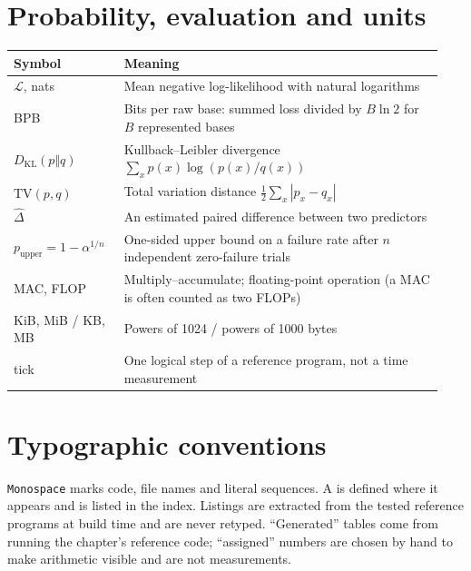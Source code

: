 \section{Probability, evaluation and units}
\begin{center}\small
\begin{tabular}{@{}P{0.24\linewidth}P{0.70\linewidth}@{}}
\toprule
Symbol & Meaning\\\midrule
$\mathcal L$, nats & Mean negative log-likelihood with natural logarithms\\
BPB & Bits per raw base: summed loss divided by $B\ln2$ for $B$ represented bases\\
$D_{\mathrm{KL}}(p\Vert q)$ & Kullback--Leibler divergence $\sum_xp(x)\log(p(x)/q(x))$\\
$\mathrm{TV}(p,q)$ & Total variation distance $\tfrac12\sum_x|p_x-q_x|$\\
$\widehat\Delta$ & An estimated paired difference between two predictors\\
$p_{\mathrm{upper}}=1-\alpha^{1/n}$ & One-sided upper bound on a failure rate after $n$ independent zero-failure trials\\
MAC, FLOP & Multiply--accumulate; floating-point operation (a MAC is often counted as two FLOPs)\\
KiB, MiB / KB, MB & Powers of 1024 / powers of 1000 bytes\\
tick & One logical step of a reference program, not a time measurement\\
\bottomrule
\end{tabular}
\end{center}

\section{Typographic conventions}
\texttt{Monospace} marks code, file names and literal sequences. A  is
defined where it appears and is listed in the index. Listings are extracted from the
tested reference programs at build time and are never retyped. ``Generated'' tables
come from running the chapter's reference code; ``assigned'' numbers are chosen by hand
to make arithmetic visible and are not measurements.
